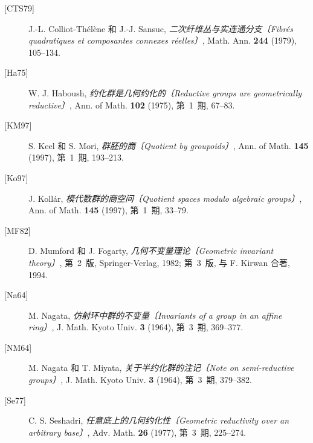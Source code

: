 \begin{description}
\item[{[CTS79]}] J.-L. Colliot-Th\'el\`ene 和 J.-J. Sansuc,
  \emph{二次纤维丛与实连通分支〔Fibr\'es quadratiques et composantes connexes r\'eelles〕}, Math. Ann.
  \textbf{244} (1979), 105--134.
\item[{[Ha75]}] W. J. Haboush, \emph{约化群是几何约化的〔Reductive groups are geometrically
  reductive〕}, Ann. of Math. \textbf{102} (1975), 第~1~期, 67--83.
\item[{[KM97]}] S. Keel 和 S. Mori, \emph{群胚的商〔Quotient by groupoids〕}, Ann. of Math.
  \textbf{145} (1997), 第~1~期, 193--213.
\item[{[Ko97]}] J. Koll\'ar, \emph{模代数群的商空间〔Quotient spaces modulo algebraic groups〕}, Ann.
  of Math. \textbf{145} (1997), 第~1~期, 33--79.
\item[{[MF82]}] D. Mumford 和 J. Fogarty, \emph{几何不变量理论〔Geometric invariant theory〕},
  第~2~版, Springer-Verlag, 1982; 第~3~版, 与 F. Kirwan 合著, 1994.
\item[{[Na64]}] M. Nagata, \emph{仿射环中群的不变量〔Invariants of a group in an affine ring〕},
  J. Math. Kyoto Univ. \textbf{3} (1964), 第~3~期, 369--377.
\item[{[NM64]}] M. Nagata 和 T. Miyata, \emph{关于半约化群的注记〔Note on semi-reductive groups〕},
  J. Math. Kyoto Univ. \textbf{3} (1964), 第~3~期, 379--382.
\item[{[Se77]}] C. S. Seshadri, \emph{任意底上的几何约化性〔Geometric reductivity over an arbitrary
  base〕}, Adv. Math. \textbf{26} (1977), 第~3~期, 225--274.
\end{description}

\endgroup


